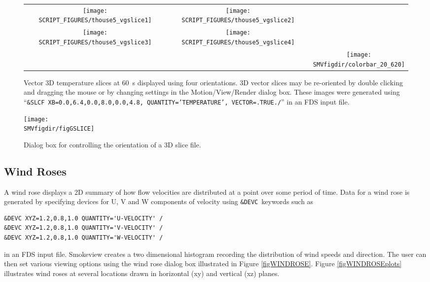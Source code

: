 \documentclass[11pt,twoside]{book}
\newcommand{\figheightAbar}{2.2in}
\begin{document}
\begin{figure}[bph]
\begin{center}
\begin{tabular}{ccc}
\texttt{[image: SCRIPT\_FIGURES/thouse5\_vgslice1]}&
\texttt{[image: SCRIPT\_FIGURES/thouse5\_vgslice2]}\\
\texttt{[image: SCRIPT\_FIGURES/thouse5\_vgslice3]}&
\texttt{[image: SCRIPT\_FIGURES/thouse5\_vgslice4]}&\\
&&\raisebox{0.0ex}[0pt]{\texttt{[image: \\SMVfigdir/colorbar\_20\_620]}}\\
\end{tabular}
\caption [General oriented vector temperature slices.]
{
Vector 3D temperature slices at 60~s displayed using four orientations.
3D vector slices may be re-oriented by double clicking and dragging the mouse
or by changing settings in the Motion/View/Render dialog box.
These images were generated using
``{\tt \&SLCF XB=0.0,6.4,0.0,8.0,0.0,4.8, QUANTITY='TEMPERATURE', VECTOR=.TRUE./}'' in an FDS
input file. }
\label{figvgslice}%
\end{center}
\end{figure}

\begin{figure}[bph]
\centerline{
\texttt{[image: \\SMVfigdir/figGSLICE]}
}
\caption[Dialog box for controlling the orientation of a 3D slice file.]{Dialog box for controlling the orientation of a 3D slice file.}
\label{figGSLICE}
\end{figure}

\subsection{Wind Roses}
A wind rose displays a 2D summary of how flow velocities are distributed at a point over some period of time. Data for a wind rose is generated by specifying devices for U, V and W components of velocity using {\tt \&DEVC}\ keywords such as

\begin{verbatim}
&DEVC XYZ=1.2,0.8,1.0 QUANTITY='U-VELOCITY' /
&DEVC XYZ=1.2,0.8,1.0 QUANTITY='V-VELOCITY' /
&DEVC XYZ=1.2,0.8,1.0 QUANTITY='W-VELOCITY' /
\end{verbatim}

\noindent in an FDS input file.  Smokeview creates a two dimensional histogram recording the distribution of wind speeds and direction.
The user can then set various viewing options using the wind rose dialog box illustrated in Figure \ref{figWINDROSE}. Figure \ref{figWINDROSEplots}
illustrates wind roses at several locations drawn in horizontal (xy) and vertical (xz) planes.
\end{document}
